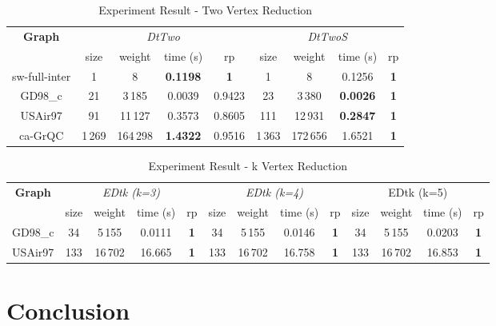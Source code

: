\documentclass[sigconf, nonacm]{acmart}
\begin{document}
\begin{table}[htbp]
\caption{Experiment Result - Two Vertex Reduction}
\label{tab:experimenttwo}
\begin{tabular}{c|cccc|cccc}
\hline
\multirow{2}{*}{\textbf{Graph}} & \multicolumn{4}{c|}{\textit{DtTwo}} & \multicolumn{4}{c}{\textit{DtTwoS}} \\ \cline{2-9} 
              & size & weight & time (s)        & rp              & size & weight & time (s)        & rp         \\ \hline
sw-full-inter & 1    & 8      & \textbf{0.1198} & \textbf{1}      & 1    & 8      & 0.1256          & \textbf{1} \\
GD98\_c       & 21   & 3\,185   & 0.0039          & 0.9423 & 23   & 3\,380   & \textbf{0.0026}  & \textbf{1} \\
USAir97       & 91   & 11\,127  & 0.3573 & 0.8605          & 111  & 12\,931  & \textbf{0.2847} & \textbf{1} \\
ca-GrQC       & 1\,269 & 164\,298 & \textbf{1.4322} & 0.9516          & 1\,363 & 172\,656 & 1.6521          & \textbf{1} \\ \hline
\end{tabular}
\end{table}

\begin{table}[htbp]
\caption{Experiment Result - k Vertex Reduction}
\label{tab:experimentk}
\begin{tabular}{c|cccc|cccc|cccc}
\hline
\multirow{2}{*}{\textbf{Graph}} & \multicolumn{4}{c|}{\textit{EDtk (k=3)}} & \multicolumn{4}{c|}{\textit{EDtk (k=4)}} & \multicolumn{4}{c}{EDtk (k=5)} \\ \cline{2-13} 
        & size & weight & time (s) & rp         & size & weight & time (s) & rp         & size & weight & time (s) & rp         \\ \hline
GD98\_c & 34   & 5\,155   & 0.0111   & \textbf{1} & 34   & 5\,155   & 0.0146   & \textbf{1} & 34   & 5\,155   & 0.0203   & \textbf{1} \\
USAir97 & 133  & 16\,702  & 16.665   & \textbf{1} & 133  & 16\,702  & 16.758   & \textbf{1} & 133  & 16\,702  & 16.853   & \textbf{1} \\ \hline
\end{tabular}
\end{table}


\section{Conclusion}
\end{document}
